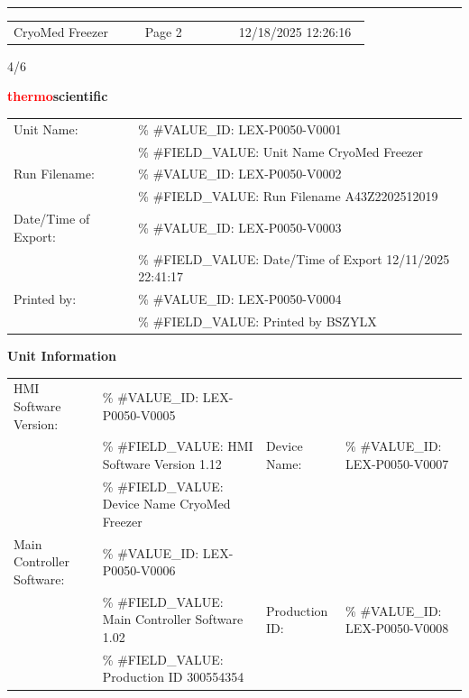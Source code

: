 \documentclass[UTF8,10pt,a4paper,fontset=fandol]{ctexart}
\newcommand{\fieldvalue}[1]{#1}
\newcommand{\handwritten}[1]{#1}
\begin{document}
\vfill

\noindent\rule{\linewidth}{0.4pt}

\noindent
\begin{tabular}{@{}p{0.35\linewidth}p{0.25\linewidth}p{0.35\linewidth}@{}}
CryoMed Freezer & Page 2 & 12/18/2025 12:26:16
\end{tabular}

\begin{flushright}
\handwritten{4/6}
\end{flushright}

\newpage

\begin{flushright}
\textcolor{red}{\textbf{thermo}}\textbf{scientific}
\end{flushright}

\noindent
\begin{tabular}{@{}ll@{}}
Unit Name:
& \% \#VALUE\_ID: LEX-P0050-V0001\\[-2pt]
& \% \#FIELD\_VALUE: Unit Name
\fieldvalue{CryoMed Freezer}\\
Run Filename:
& \% \#VALUE\_ID: LEX-P0050-V0002\\[-2pt]
& \% \#FIELD\_VALUE: Run Filename
\fieldvalue{A43Z2202512019}\\
Date/Time of Export:
& \% \#VALUE\_ID: LEX-P0050-V0003\\[-2pt]
& \% \#FIELD\_VALUE: Date/Time of Export
\fieldvalue{12/11/2025 22:41:17}\\
Printed by:
& \% \#VALUE\_ID: LEX-P0050-V0004\\[-2pt]
& \% \#FIELD\_VALUE: Printed by
\fieldvalue{BSZYLX}
\end{tabular}

\vspace{2pt}
\noindent\textbf{Unit Information}

\noindent
\begin{tabular}{@{}ll@{\hspace{3.5cm}}ll@{}}
HMI Software Version:
& \% \#VALUE\_ID: LEX-P0050-V0005\\[-2pt]
& \% \#FIELD\_VALUE: HMI Software Version
\fieldvalue{1.12}
&
Device Name:
& \% \#VALUE\_ID: LEX-P0050-V0007\\[-2pt]
& \% \#FIELD\_VALUE: Device Name
\fieldvalue{CryoMed Freezer}\\
Main Controller Software:
& \% \#VALUE\_ID: LEX-P0050-V0006\\[-2pt]
& \% \#FIELD\_VALUE: Main Controller Software
\fieldvalue{1.02}
&
Production ID:
& \% \#VALUE\_ID: LEX-P0050-V0008\\[-2pt]
& \% \#FIELD\_VALUE: Production ID
\fieldvalue{300554354}
\end{tabular}
\end{document}
